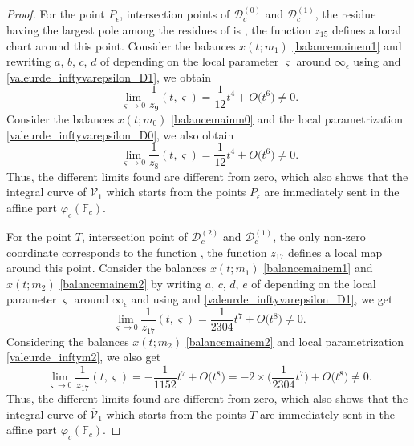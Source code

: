 \documentclass[10pt,a4paper]{amsart}
\numberwithin{equation}{section}
\begin{document}
\begin{proof}
 For the point $P_{\epsilon}$, intersection points of $\mathcal{D}_c^{(0)}$ and $\mathcal{D}_c^{(1)}$,
 the residue having the largest pole among the residues of
 is , the function $z_{15}$ defines a local chart around this point. Consider the balances $x(t;m_1)$
 \ref{balancemainem1} and rewriting $a$, $b$, $c$, $d$ of
  depending on the local parameter $\varsigma$ around $\infty_{\epsilon}$ using  and \eqref{valeurde_inftyvarepsilon_D1},
 we obtain \[\lim \limits_{\varsigma\rightarrow
 0}\frac{1}{z_9}(t,\varsigma)=\frac{1}{12}t^4+O\bigl(t^6\bigr)\neq0.\]
 Consider the balances $x(t;m_0)$
 \eqref{balancemainm0} and the local parametrization \eqref{valeurde_inftyvarepsilon_D0}, we also obtain
 \[
 \lim \limits_{\varsigma\rightarrow 0}\frac{1}{z_8}(t,\varsigma)=\frac{1 }{12}t^4+O\bigl(t^6\bigr)\neq0.
 \]
 Thus, the different limits found are different from zero, which also shows that the integral curve of $\overline{\mathcal{V}}_1$ which starts from the points $P_{\epsilon}$ are
 immediately sent in the affine part $\varphi_c(\mathbb{F}_c)$.

 For the point $T$, intersection point of $\mathcal{D}_c^{(2)}$ and $\mathcal{D}_c^{( 1)}$,
 the only non-zero coordinate corresponds to the function , the function $z_{17}$
 defines a local map around this point. Consider the balances $x(t;m_1)$ \eqref{balancemainem1}
 and $x(t;m_2)$ \eqref{balancemainem2} by writing $a$, $c$, $d$, $e$ of  depending on the local parameter $\varsigma$ around $\infty_{\epsilon}$ and
 using  and \eqref{valeurde_inftyvarepsilon_D1}, we get
 \[
 \lim \limits_{\varsigma\rightarrow 0}\frac{1}{z_{17}}(t,\varsigma)=\frac{1}{2304}t^7+O\bigl(t^8\bigr)\neq0.
 \]
 Considering the balances $x(t;m_2)$
 \eqref{balancemainem2} and local parametrization
 \eqref{valeurde_inftym2}, we also get
 \[
 \lim\limits_{\varsigma\rightarrow 0}\frac{1}{z_{17}}(t,\varsigma)=-\frac{1 }{1152}t^7+O\bigl(t^8\bigr)=-2\times\biggl(\frac{1}{2304}t^7\biggr)+O\bigl(t^8 \bigr)\neq0.
 \]
 Thus, the different limits found are different from zero,
 which also shows that the integral curve of $\overline{\mathcal{V}}_1$ which starts from the points $T$ are
 immediately sent in the affine part $\varphi_c(\mathbb{F}_c)$.


\end{proof}
\end{document}

